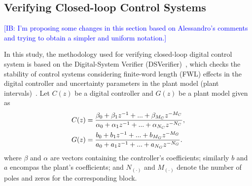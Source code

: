 \documentclass{sig-alternate-05-2015}
\newcommand{\red}[1]{{\color{red}#1}}
\begin{document}
{%
}

\subsection{Verifying Closed-loop Control Systems}
\label{verifying-closed-loop-control-systems}



\textcolor{blue}{[IB: I'm proposing some changes in this section based on Alessandro's comments and trying to obtain a simpler and uniform notation.]}

In this study, the methodology used for verifying closed-loop digital
control system is based on the Digital-System Verifier
(DSVerifier)~\cite{IsmailBCFF15}, which checks the stability of control
systems considering finite-word length (FWL) effects in the digital
controller and uncertainty parameters in the plant model (plant
intervals)~\cite{Bessa16}.  Let $C(z)$ be a digital controller and $G(z)$ be
a plant model given as
%
\begin{align}
\small
\label{controller_plant_tf}
C(z)&=\frac{\beta_{0}+\beta_{1}z^{-1}+...+\beta_{M_C}z^{-M_C}}{\alpha_{0}+\alpha_{1}z^{-1}+...+\alpha_{N_C}z^{-N_C}}, \\
G(z)&=\frac{b_{0}+b_{1}z^{-1}+...+b_{M_G}z^{-M_G}}{a_{0}+a_{1}z^{-1}+...+a_{N_G}z^{-N_G}}.
\end{align}
%
\noindent where $\beta$ and $\alpha$ are vectors containing the controller's coefficients;  
similarly $b$ and $a$ encompas the plant's coefficients;  
and $N_{(\cdot)}$ and $M_{(\cdot)}$ denote the number of poles and zeros for the corresponding block.
\end{document}
